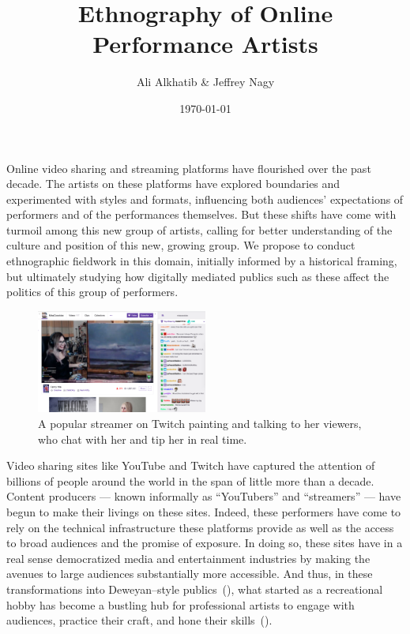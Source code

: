 \documentclass[10pt]{article}
\title{Ethnography of Online Performance Artists}
\author{Ali Alkhatib \& Jeffrey Nagy
}
\date{\today}
\makeatletter
\renewcommand{\maketitle}{\bgroup\setlength{\parindent}{0pt}
\begin{flushleft}
  {\scshape \LARGE \textbf{\@title}}

  \@author
\end{flushleft}\egroup
}
\renewenvironment{abstract}{%
\hfill\begin{minipage}{0.95\textwidth}
\itshape
}
{
\bigskip
\end{minipage}}
\makeatother
\begin{document}
  \maketitle
  \begin{abstract}
  Online video sharing and streaming platforms have flourished over the past decade.
  The artists on these platforms have
  explored boundaries and experimented with styles and formats,
  influencing both audiences' expectations of performers and of the performances themselves.
  But these shifts have come with turmoil among this new group of artists,
  calling for better understanding of the culture and position of this new, growing group.
  We propose to conduct ethnographic fieldwork in this domain,
  initially informed by a historical framing, but
  ultimately studying how digitally mediated publics such as these affect
  the politics of this group of performers.
  \end{abstract}

\begin{figure}
\centering
\includegraphics[width=0.5\textwidth]{figures/painting.png}
\caption{\label{fig:Magic}A popular streamer on Twitch painting and talking to her viewers, who chat with her and tip her in real time.}
\end{figure}
Video sharing sites like YouTube and Twitch
have captured the attention of billions of people around the world
in the span of little more than a decade.
Content producers
--- known informally as ``YouTubers'' and ``streamers'' ---
have begun to make their livings on these sites.
Indeed, these performers have come to rely on
the technical infrastructure these platforms provide as well as
the access to broad audiences and the promise of exposure.
In doing so, these sites have in a real sense democratized media and entertainment industries by
making the avenues to large audiences substantially more accessible.
And thus, in these transformations into Deweyan--style publics~(\cite{dewey2012public,disalvo2009design}), what started as
a recreational hobby
has become a bustling hub for professional artists to
engage with audiences,
practice their craft, and 
hone their skills~(\cite{Hamilton:2014:STF:2611105.2557048,Zhang:2015:CIL:2736084.2736091}).
\end{document}
